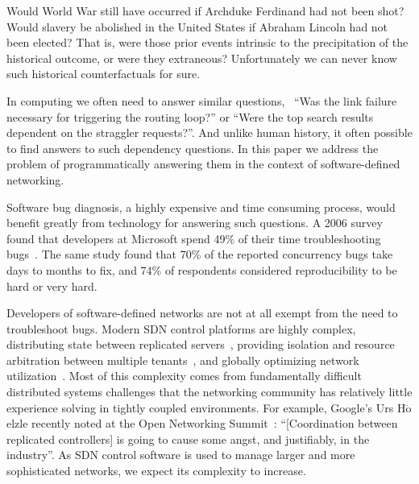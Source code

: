
Would World War  still have occurred if Archduke Ferdinand had not been
shot? Would slavery be abolished in the United States if Abraham Lincoln had
not been elected? That is,
were those prior events intrinsic to the
precipitation of the historical outcome, or
were they extraneous? Unfortunately we can never know such
historical counterfactuals for sure.

In computing we often need to answer similar questions,
\eg~``Was the link failure necessary for triggering the routing loop?''
or ``Were the top search results dependent on the straggler requests?''.
And unlike human history, it often possible to find answers to such
dependency questions. In this paper we address the problem of programmatically answering
them in the context of software-defined networking.

Software bug diagnosis, a highly expensive and time consuming process, would benefit
greatly from technology for answering such questions. A 2006 survey found
that developers at Microsoft spend 49\% of their
time troubleshooting bugs~\cite{msoft_concurrency}. The same study found that 70\% of the reported concurrency bugs
take days to months to fix, and 74\% of
respondents considered reproducibility to be hard or very hard.

Developers of software-defined networks are not at all exempt from the need to
troubleshoot bugs. Modern SDN control platforms are highly complex,
distributing state between replicated
servers~\cite{floodlight},
providing isolation and resource arbitration between multiple
tenants~\cite{Casado:2010:VNF:1921151.1921162}, and
globally optimizing network utilization~\cite{urs}.
Most of this complexity comes from
fundamentally difficult distributed systems challenges that the networking community has
relatively little experience
solving in tightly coupled environments. %
For example, Google's Urs H$\ddot{\mathrm{o}}$elzle recently
noted at the Open Networking Summit~\cite{urs}: ``[Coordination between replicated controllers] is going to
cause some angst, and justifiably, in the industry''. As SDN control software
is used to manage larger and more sophisticated networks,
we expect its complexity to increase.

